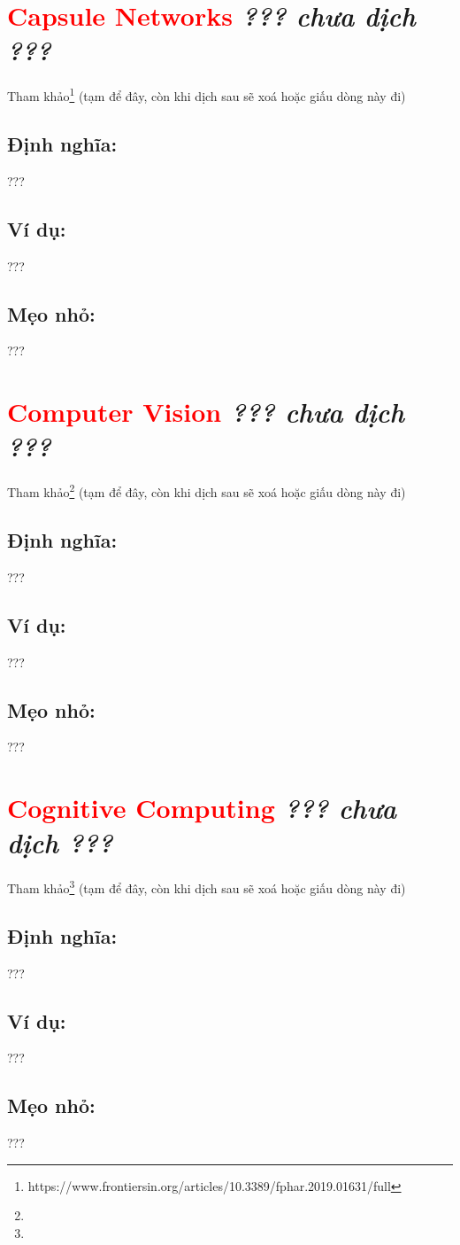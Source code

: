 \section*{\huge \textcolor{Red}{Capsule Networks}  \small \textit{??? chưa dịch ???} }
Tham khảo\footnote{https://www.frontiersin.org/articles/10.3389/fphar.2019.01631/full} (tạm để đây, còn khi dịch sau sẽ xoá hoặc giấu dòng này đi)
\subsection*{Định nghĩa:}
???
\subsection*{Ví dụ:}
???
\subsection*{Mẹo nhỏ:}
???
\section*{\huge \textcolor{Red}{Computer Vision}  \small \textit{??? chưa dịch ???} }
Tham khảo\footnote{} (tạm để đây, còn khi dịch sau sẽ xoá hoặc giấu dòng này đi)
\subsection*{Định nghĩa:}
???
\subsection*{Ví dụ:}
???
\subsection*{Mẹo nhỏ:}
???
\section*{\huge \textcolor{Red}{Cognitive Computing}  \small \textit{??? chưa dịch ???} }
Tham khảo\footnote{} (tạm để đây, còn khi dịch sau sẽ xoá hoặc giấu dòng này đi)
\subsection*{Định nghĩa:}
???
\subsection*{Ví dụ:}
???
\subsection*{Mẹo nhỏ:}
???
